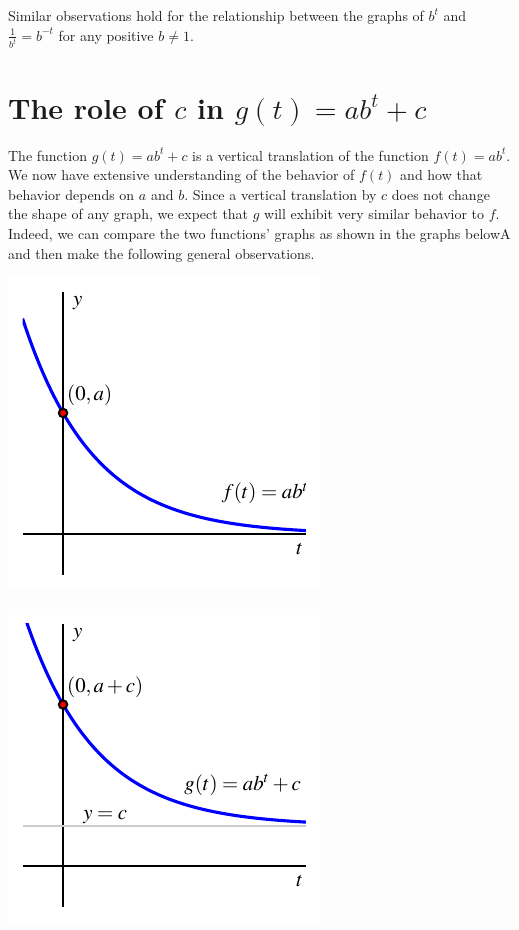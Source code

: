 \documentclass[nooutcomes]{ximera}
\begin{document}
Similar observations hold for the relationship between the graphs of \(b^{t}\) and \(\frac{1}{b^t} = b^{-t}\) for any positive \(b \ne 1\).



\section{The role of \(c\) in \(g(t) = ab^t + c\)}

The function \(g(t) = ab^t + c\) is a vertical translation of the function \(f(t) = ab^t\).  We now have extensive understanding of the behavior of \(f(t)\) and how that behavior depends on \(a\) and \(b\).  Since a vertical translation by \(c\) does not change the shape of any graph, we expect that \(g\) will exhibit very similar behavior to \(f\).  Indeed, we can compare the two functions' graphs as shown in the graphs belowA and then make the following general observations.

\begin{image}
\includegraphics{modeling-vert-transl-0}
\end{image}

\begin{image}
\includegraphics{modeling-vert-transl-c}
\end{image}
\end{document}
